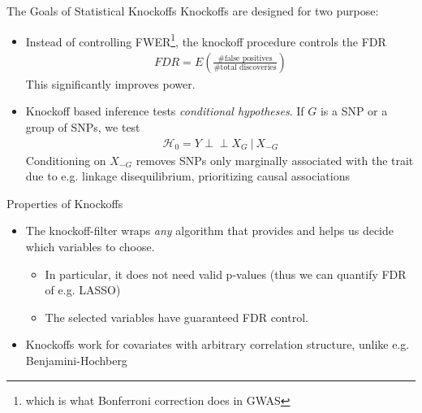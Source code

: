 \documentclass[aspectratio=169, 10pt]{beamer}
\newcommand{\indep}{\perp \!\!\! \perp}
\begin{document}
\begin{frame}{The Goals of Statistical Knockoffs}
Knockoffs are designed for two purpose:
\begin{itemize}
    \item Instead of controlling FWER\footnote{which is what Bonferroni correction does in GWAS}, the knockoff procedure controls the FDR
    \begin{align*}
        FDR = E\left(\frac{\# \text{false positives}}{\text{\# total discoveries}}\right)
    \end{align*}
    This significantly improves power.
    \item Knockoff based inference tests \textit{conditional hypotheses}. If $G$ is a SNP or a group of SNPs, we test
    \begin{align*}
        \mathcal{H}_0 = Y \indep X_G \ | \ X_{-G}
    \end{align*}
     Conditioning on $X_{-G}$ removes SNPs only marginally associated with the trait due to e.g. linkage disequilibrium, prioritizing causal associations
\end{itemize}
\end{frame}

\begin{frame}{Properties of Knockoffs}
\begin{itemize}
    \item The knockoff-filter wraps \textit{any} algorithm that provides  and helps us decide which variables to choose. 
    \begin{itemize}
        \item In particular, it does not need valid p-values (thus we can quantify FDR of e.g. LASSO)
        \item The selected variables have guaranteed FDR control. 
    \end{itemize}
    \item Knockoffs work for covariates with arbitrary correlation structure, unlike e.g. Benjamini-Hochberg
\end{itemize}
\end{frame}
\end{document}
